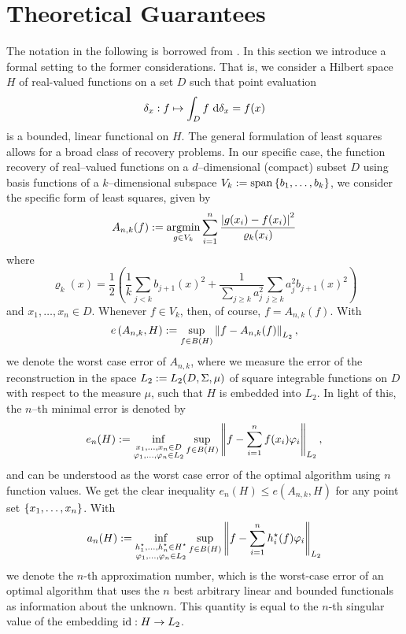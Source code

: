 \documentclass[12pt, oneside]{amsart}
\theoremstyle{definition}
\theoremstyle{remark}
\numberwithin{equation}{section}
\begin{document}
\section{Theoretical Guarantees}

The notation in the following is borrowed from \cite{Ullrich_2020}.
In this section we introduce a formal setting to the former considerations. That is, we consider a Hilbert space \(H\) of real-valued functions on a set \(D\) such that point evaluation \[
    \delta_x: f \mapsto \int_D f\ \d \delta_x = f(x)
\]
is a bounded, linear functional on \(H\).
The general formulation of least squares allows for a broad class of recovery problems. In our specific case, the function recovery of real--valued functions on a \(d\)--dimensional (compact) subset \(D\) using basis functions of a \(k\)--dimensional subspace \(V_k \defn \spn \set{b_1, \dots, b_k}\), we consider the specific form of least squares, given by\[
    A_{n, k}(f) \defn \argmin_{g \in V_k} \sum_{i=1}^n \frac{\abs{g(x_i) - f(x_i)}^2}{\varrho_k(x_i)}
\]
where \[
    \varrho_k(x) = \frac{1}{2} \left( \frac{1}{k} \sum_{j < k} b_{j+1}(x)^2 + \frac{1}{\sum_{j \geq k} a_j^2} \sum_{j \geq k} a_j^2 b_{j+1}(x)^2 \right)
\]
and \(x_1, \dots, x_n \in D\). Whenever \(f \in V_k\), then, of course, \(f = A_{n, k}(f)\). With
\begin{equation}\label{eq:worstCaseError}
    e\left(A_{n,k}, H\right) \defn \sup_{f \in B(H)} \norm[L_2]{f - A_{n,k}(f)},
\end{equation}
we denote the worst case error of \(A_{n,k}\), where we measure the error of the reconstruction in the space \(L_2 \defn L_2(D, \Sigma, \mu)\) of square integrable functions on \(D\) with respect to the measure \(\mu\), such that \(H\) is embedded into \(L_2\). In light of this, the \(n\)--th minimal error is denoted by \[
    e_n(H) \defn \inf_{\substack{x_1, \dots, x_n \in D \\ \phi_1, \dots, \phi_n \in L_2}} \sup_{f \in B(H)} \norm[L_2]{f - \sum_{i=1}^n f(x_i) \phi_i},
\]
and can be understood as the worst case error of the optimal algorithm using \(n\) function values. We get the clear inequality \(e_n(H) \leq e(A_{n,k}, H)\) for any point set \(\set{x_1, \dots, x_n}\). With \[
    a_n(H) := \inf_{\substack{h_1^\star, \dots, h_n^\star \in H^\star \\ \phi_1, \dots, \phi_n \in L_2}} \sup_{f \in B(H)} \norm[L_2]{f - \sum_{i=1}^n h_i^\star(f) \phi_i}
\]
we denote the \(n\)-th approximation number, which is the worst-case error of an optimal algorithm that uses the \(n\) best arbitrary linear and bounded functionals as information about the unknown. This quantity is equal to the \(n\)-th singular value of the embedding \(\id: H \to L_2\).
\end{document}
